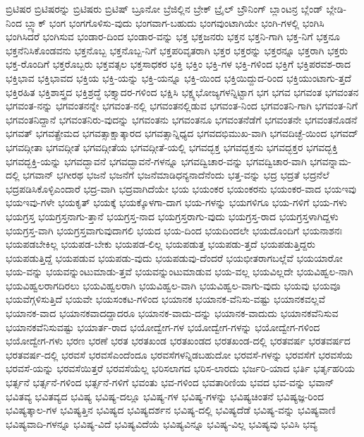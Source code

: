 {ಬ್ರಿಟಿಷರ
ಬ್ರಿಟಿಷರನ್ನು
ಬ್ರಿಟಿಷರು
ಬ್ರಿಟಿಷ್
ಬ್ರೂನೋ
ಬ್ರೆಜಿಲ್ಲಿನ
ಬ್ರೇಕ್
ಬ್ರೈಲ್
ಬ್ರೌನಿಂಗ್
ಬ್ಲಾಂಟನ್ರ
ಬ್ಲೆಂಡ್
ಬ್ಲೇಡಿ-ನಿಂದ
ಬ್ಲ್ಯಾಕ್
ಭಂಗ
ಭಂಗಗೊಳಿಸು-ವುದು
ಭಂಗವಾಗ-ಬಹುದು
ಭಂಗವುಂಟಾಗಿಯೇ
ಭಂಗಿ-ಗಳಲ್ಲಿ
ಭಂಗಿಸಿ
ಭಂಗಿಸಿದರೆ
ಭಂಗಿಸುವ
ಭಂಡಾರ-ದಿಂದ
ಭಂಡಾರ-ವನ್ನು
ಭಕ್ತ
ಭಕ್ತಜನರು
ಭಕ್ತನ
ಭಕ್ತನಿ-ಗಾಗಿ
ಭಕ್ತ-ನಿಗೆ
ಭಕ್ತನೂ
ಭಕ್ತನೆನಿಸಿಕೊಂಡವನು
ಭಕ್ತನೊಬ್ಬ
ಭಕ್ತನೊಬ್ಬ-ನಿಗೆ
ಭಕ್ತಪರಿವೃತರಾಗಿ
ಭಕ್ತರ
ಭಕ್ತರನ್ನು
ಭಕ್ತರನ್ನೂ
ಭಕ್ತರಾಗಿ
ಭಕ್ತರು
ಭಕ್ತ-ರೊಂದಿಗೆ
ಭಕ್ತರೊಬ್ಬರು
ಭಕ್ತವತ್ಸಲ
ಭಕ್ತಸಾಧಕರ
ಭಕ್ತಿ
ಭಕ್ತಿಂ
ಭಕ್ತಿ-ಗಳ
ಭಕ್ತಿ-ಗಳಿಂದ
ಭಕ್ತಿಗೆ
ಭಕ್ತಿಪರವಶ-ರಾದ
ಭಕ್ತಿಭಾವ
ಭಕ್ತಿಭಾವದ
ಭಕ್ತಿಯ
ಭಕ್ತಿ-ಯನ್ನು
ಭಕ್ತಿ-ಯನ್ನೂ
ಭಕ್ತಿ-ಯಿಂದ
ಭಕ್ತಿಯಿದ್ದುದ-ರಿಂದ
ಭಕ್ತಿಯುಂಟಾಗು-ತ್ತದೆ
ಭಕ್ತಿರಹಿತ
ಭಕ್ತಿಶಾಸ್ತ್ರದ
ಭಕ್ತಿಶ್ರದ್ಧೆ
ಭಕ್ತ್ಯಾದರ-ಗಳಿಂದ
ಭಕ್ಷಿಸಿ
ಭಕ್ಷ್ಯಭೋಜ್ಯಗಳನ್ನಿಟ್ಟಾಗ
ಭಗ
ಭಗವ
ಭಗವಂತ
ಭಗವಂತನ
ಭಗವಂತ-ನನ್ನು
ಭಗವಂತನನ್ನೇ
ಭಗವಂತ-ನಲ್ಲಿ
ಭಗವಂತನಲ್ಲಿಡುವ
ಭಗವಂತ-ನಿಂದ
ಭಗವಂತನಿ-ಗಾಗಿ
ಭಗವಂತ-ನಿಗೆ
ಭಗವಂತನಿದ್ದಾನೆ
ಭಗವಂತನಿರು-ವುದನ್ನು
ಭಗವಂತನು
ಭಗವಂತನೂ
ಭಗವಂತನೆಡೆಗೆ
ಭಗವಂತನೇ
ಭಗವಂತನೊಡನೆ
ಭಗವತ್
ಭಗವತ್ಪ್ರೇಮದ
ಭಗವತ್ಸಾಕ್ಷಾತ್ಕಾರದ
ಭಗವತ್ಸಾನ್ನಿಧ್ಯದ
ಭಗವದಭಿಮುಖ-ವಾಗಿ
ಭಗವದಿಚ್ಛೆ-ಯಿಂದ
ಭಗವದ್
ಭಗವದ್ಗೀತಾ
ಭಗವದ್ಗೀತೆ
ಭಗವದ್ಗೀತೆಯ
ಭಗವದ್ಗೀತೆ-ಯಲ್ಲಿ
ಭಗವದ್ಭಕ್ತ
ಭಗವದ್ಭಕ್ತನು
ಭಗವದ್ಭಕ್ತರ
ಭಗವದ್ಭಕ್ತಿ
ಭಗವದ್ಭಕ್ತಿ-ಯನ್ನು
ಭಗವದ್ಭಾವನೆ
ಭಗವದ್ಭಾವನೆ-ಗಳನ್ನೂ
ಭಗವದ್ವಿಚಾರ-ವನ್ನು
ಭಗವದ್ವಿಚಾರ-ವಾಗಿ
ಭಗವನ್ನಾಮ-ದಲ್ಲಿ
ಭಗವಾನ್
ಭಗೀರಥ
ಭಜನೆ
ಭಜನೆಗೆ
ಭಜನೆಮಾಡಿಧನ್ಯನಾದೆನೆಂದು
ಭತ್ತ-ವನ್ನು
ಭದ್ರ
ಭದ್ರತೆ
ಭದ್ರನೆಲೆ
ಭದ್ರಪಡಿಸಿಕೊಳ್ಳಿಎಂದಾರೆ
ಭದ್ರ-ವಾಗಿ
ಭದ್ರವಾಗಿದೆಯೇ
ಭಯ
ಭಯಂಕರ
ಭಯಂಕರನು
ಭಯಂಕರ-ವಾದ
ಭಯಇವು
ಭಯಇವು-ಗಳೇ
ಭಯಕೃತ್
ಭಯಕ್ಕೆ
ಭಯಕ್ಕೊಳಗಾ-ದಾಗ
ಭಯ-ಗಳನ್ನು
ಭಯಗಳಿಗೂ
ಭಯ-ಗಳಿಗೆ
ಭಯ-ಗಳು
ಭಯಗ್ರಸ್ತ
ಭಯಗ್ರಸ್ತನಾಗು-ತ್ತಾನೆ
ಭಯಗ್ರಸ್ತ-ನಾದ
ಭಯಗ್ರಸ್ತರಾಗು-ವುದು
ಭಯಗ್ರಸ್ತ-ರಾದ
ಭಯಗ್ರಸ್ತಳಾಗಿದ್ದಳು
ಭಯಗ್ರಸ್ತ-ವಾಗಿ
ಭಯಗ್ರಸ್ತವಾಗುವುದಾಗಲಿ
ಭಯದ
ಭಯ-ದಿಂದ
ಭಯದಿಂದಲೇ
ಭಯದೊಂದಿಗೆ
ಭಯನಾಶನಃ
ಭಯಪಡಬೇಕಿಲ್ಲ
ಭಯಪಡ-ಬೇಕು
ಭಯಪಡ-ಲಿಲ್ಲ
ಭಯಪಡುತ್ತ
ಭಯಪಡು-ತ್ತದೆ
ಭಯಪಡುತ್ತಿದ್ದರು
ಭಯಪಡುತ್ತಿದ್ದೆ
ಭಯಪಡುವ
ಭಯಪಡು-ವುದು
ಭಯಪಡುವು-ದೆಂದರೆ
ಭಯಭೀತರಾಗಬಲ್ಲೆವೆ
ಭಯಯಾರೋ
ಭಯ-ವನ್ನು
ಭಯವನ್ನುಂಟುಮಾಡು-ತ್ತವೆ
ಭಯವನ್ನುಂಟುಮಾಡುವ
ಭಯ-ವಲ್ಲ
ಭಯವಿಲ್ಲದೇ
ಭಯವಿಹ್ವಲ-ನಾಗಿ
ಭಯವಿಹ್ವಲರಾಗದಿರಲು
ಭಯವಿಹ್ವಲರಾಗಿ
ಭಯವಿಹ್ವಲ-ವಾಗಿ
ಭಯವಿಹ್ವಲ-ವಾಗು-ವುದು
ಭಯವು
ಭಯವೂ
ಭಯವೆಗ್ಗಳಿಸುತ್ತಿದೆ
ಭಯವೇ
ಭಯಸಂಕಟ-ಗಳಿಂದ
ಭಯಾನಕ
ಭಯಾನಕ-ವೆನಿಸು-ವಷ್ಟು
ಭಯಾನಕವಲ್ಲವೆ
ಭಯಾನಕ-ವಾದ
ಭಯಾನಕವಾದದ್ದಾದರೂ
ಭಯಾನಕ-ವಾದು-ದನ್ನು
ಭಯಾನಕ-ವಾದುದು
ಭಯಾನಕವೆನಿಸುವ
ಭಯಾನಕವೆನಿಸುವಷ್ಟು
ಭಯಾರ್ತ-ರಾದ
ಭಯೋದ್ವೇಗ-ಗಳ
ಭಯೋದ್ವೇಗ-ಗಳನ್ನು
ಭಯೋದ್ವೇಗ-ಗಳಿಂದ
ಭಯೋದ್ವೇಗ-ಗಳು
ಭರಣ
ಭರಣೆ
ಭರತ
ಭರತಖಂಡ
ಭರತಖಂಡದ
ಭರತಖಂಡ-ದಲ್ಲಿ
ಭರತವರ್ಷ
ಭರತವರ್ಷದ
ಭರತವರ್ಷ-ದಲ್ಲಿ
ಭರವಸೆ
ಭರವಸೆಎಂದೆಂದೂ
ಭರವಸೆಗಳನ್ನಿಡಬಹುದೋ
ಭರವಸೆ-ಗಳನ್ನು
ಭರವಸೆಗೆ
ಭರವಸೆಯ
ಭರವಸೆ-ಯನ್ನು
ಭರವಸೆಯಿತ್ತರೆ
ಭರವಸೆಯೆಲ್ಲ
ಭರಿಸಲಾಗದ
ಭರಿಸ-ಲಾರದು
ಭರ್ಜರಿ-ಯಾದ
ಭರ್ತಿ
ಭರ್ತೃಹರಿಯ
ಭರ್ತ್ಸನೆ
ಭರ್ತ್ಸನೆ-ಗಳಿಂದ
ಭರ್ತ್ಸನೆ-ಗಳಿಗೆ
ಭವಂತು
ಭವ-ಗಳಿಂದ
ಭವತಾರಿಣಿಯ
ಭವದ
ಭವ-ವನ್ನು
ಭವಾನ್
ಭವಿತವ್ಯ
ಭವಿತವ್ಯದ
ಭವಿಷ್ಯ
ಭವಿಷ್ಯ-ದಲ್ಲೂ
ಭವಿಷ್ಯ-ಗಳ
ಭವಿಷ್ಯ-ಗಳನ್ನು
ಭವಿಷ್ಯಚಿಂತನೆ
ಭವಿಷ್ಯಜ್ಞ-ರಿಂದ
ಭವಿಷ್ಯತ್ಕಾಲ-ಗಳ
ಭವಿಷ್ಯತ್ತಿನ
ಭವಿಷ್ಯದ
ಭವಿಷ್ಯದರ್ಶನ
ಭವಿಷ್ಯ-ದಲ್ಲಿ
ಭವಿಷ್ಯದೆಡೆ
ಭವಿಷ್ಯ-ವನ್ನು
ಭವಿಷ್ಯವಾಣಿ
ಭವಿಷ್ಯವಾದಿ-ಗಳನ್ನೂ
ಭವಿಷ್ಯ-ವಿದೆ
ಭವಿಷ್ಯವಿದೆಯೆ
ಭವಿಷ್ಯವಿನ್ನೂ
ಭವಿಷ್ಯ-ವಿಲ್ಲ
ಭವಿಷ್ಯವು
ಭವಿಸಿ
ಭವ್ಯ
}
